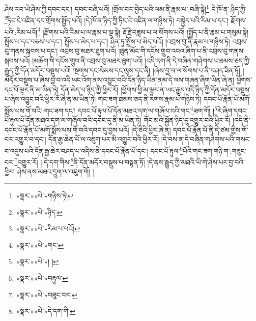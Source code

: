 ཤེས་རབ་ཡེ་ཤེས་ཀྱི་དབང་དང་། དབང་བཞི་པའོ། །གྲོལ་བར་བྱེད་པའི་ལམ་ནི་རྣམ་པ་:བཞི་སྟེ།\footnote{«སྣར་»«པེ་»གཉིས་ཏེ།} དེ་ཁོ་ན་:ཉིད་ཀྱི་\footnote{«སྣར་»«པེ་»ཉིད་}ཏིང་ངེ་འཛིན་དང་གྲོགས་སྤྱོད་པའོ། །དེ་ཁོ་ན་ཉིད་ཀྱི་ཏིང་ངེ་འཛིན་ལ་གཉིས་ཏེ། བསྐྱེད་པའི་རིམ་པ་དང་། རྫོགས་པའི་:རིམ་པའོ།\footnote{«སྣར་»«པེ་»རིམ་པ་པའོ།} །རྫོགས་པའི་རིམ་པ་ལ་རྣམ་པ་ལྔ་སྟེ། རྡོ་རྗེ་བཟླས་པ་ལ་སོགས་པའོ། །སྤྱོད་པ་ནི་རྣམ་པ་གསུམ་སྟེ། སྤྲོས་པ་དང་བཅས་པ་དང་། སྤྲོས་པ་མེད་པ་དང་། ཤིན་ཏུ་སྤྲོས་པ་མེད་པའོ། །འབྲས་བུ་ནི་རྣམ་པ་གཉིས་ཏེ། འབྲས་བུ་གནས་སྐབས་པ་དང་། འབྲས་བུ་མཐར་ཐུག་པའོ། །ཐུན་མོང་གི་དངོས་གྲུབ་འབའ་ཞིག་པ་ནི་འབྲས་བུ་གནས་སྐབས་པའོ། །མཆོག་གི་དངོས་གྲུབ་ནི་འབྲས་བུ་མཐར་ཐུག་པའོ། །འདི་དག་ནི་དེ་བཞིན་གཤེགས་པ་ཐམས་ཅད་ཀྱི་རྒྱུད་ཀྱི་དོན་མདོར་བསྡུས་པའོ། །སྔགས་དང་སེམས་དང་ལུས་དང་ནི། །ཞེས་བྱ་བ་ལ་སོགས་པ་ནི་བཤད་ཟིན་ཏོ། །མདོར་བསྡུས་པ་ཞེས་བྱ་བ་འདི་ཡང་འོག་ནས་འབྱུང་བའི་དོན་ཉིད་ཡིན་ནམ་དེ་ལས་གཞན་ཞིག་ཡིན་ཞེ་ན། ཕྱོགས་དང་པོ་ལྟར་ནི་མ་ཡིན་ཏེ། དོན་མེད་པ་ཉིད་ཀྱི་ཕྱིར་རོ། །ཕྱོགས་ཕྱི་མ་ལྟར་ན་ཡང་རྒྱུད་འདི་ཉིད་ཀྱི་དོན་མདོར་བསྡུས་པ་ཞེས་འབྱུང་བའི་ཕྱིར་རོ་ཞེ་ན་མ་ཡིན་ཏེ། གང་ཟག་ཐམས་ཅད་ནི་རིགས་རྣམ་པ་གཉིས་ཏེ། དབང་པོ་རྣོན་པོ་མགོ་སྨོས་པས་གོ་བའི་:གང་ཟག་དང་། དབང་པོ་རྟུལ་པོ་དོན་མཐའ་དག་ལ་གཞོལ་བའི་གང་\footnote{«སྣར་»«པེ་»གང་}ཟག་གོ། །\footnote{«སྣར་»«པེ་»། ། }རེ་ཞིག་དབང་པོ་རྟུལ་པོ་དོན་མཐའ་དག་ལ་གཞོལ་བའི་དབང་དུ་ནི་མ་ཡིན་ཏེ། གོང་མའི་སྐྱོན་ཉིད་དུ་འགྱུར་བའི་ཕྱིར་རོ། །འདི་ནི་དབང་པོ་རྣོན་པོ་མགོ་སྨོས་པས་གོ་བའི་དབང་དུ་བྱས་པའོ། །དེ་ཅིའི་ཕྱིར་ཞེ་ན། དབང་པོ་རྣོན་པོ་ནི་དེ་ཙམ་གྱིས་གོ་བར་འགྱུར་བ་དང་། དོན་རྒྱ་ཆེན་པོ་ལ་འཇུག་པར་མི་འགྱུར་བའི་ཕྱིར་རོ། །དེ་བས་ན་དེ་བཞིན་གཤེགས་པའི་གསང་བ་འདུས་པའི་དོན་རྒྱ་ཆེར་བཤད་པ་འདིས་ནི་དབང་པོ་རྣོན་པོ་དང་། དབང་པོ་རྟུལ་\footnote{«སྣར་»«པེ་»བརྟུལ་}པོའི་གང་ཟག་གཉི་ག་:གཟུང་བར་\footnote{«སྣར་»«པེ་»བཟུང་བར་}འགྱུར་རོ། །:དེ་དག་གིས་\footnote{«སྣར་»«པེ་»དེ་དག་གི་}ནི་དོན་མདོར་བསྡུས་པ་བསྟན་ཏོ། །དེ་ནས་རྒྱུད་ཀྱི་མཐའི་ཡི་གེ་ཤེས་པར་བྱ་བའི་ཕྱིར། ཤེས་ནས་མཐའ་དྲུག་ལ་འཇུག་གོ། །
